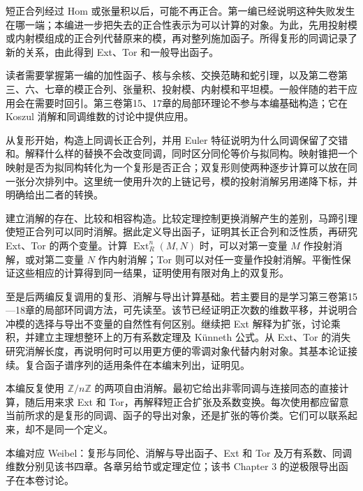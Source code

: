 
\BookPartGuide
短正合列经过 Hom 或张量积以后，可能不再正合。第一编已经说明这种失败发生在哪一端；本编进一步把失去的正合性表示为可以计算的对象。为此，先用投射模或内射模组成的正合列代替原来的模，再对整列施加函子。所得复形的同调记录了新的关系，由此得到 Ext、Tor 和一般导出函子。

\ProseParagraphBreak
读者需要掌握第一编的加性函子、核与余核、交换范畴和蛇引理，以及第二卷第三、六、七章的模正合列、张量积、投射模、内射模和平坦模。一般伴随的若干应用会在需要时回引。第三卷第15、17章的局部环理论不参与本编基础构造；它在 Koszul 消解和同调维数的讨论中提供应用。

\ProseParagraphBreak
{}从复形开始，构造上同调长正合列，并用 Euler 特征说明为什么同调保留了交错和。解释什么样的替换不会改变同调，同时区分同伦等价与拟同构。映射锥把一个映射是否为拟同构转化为一个复形是否正合；双复形则使两种逐步计算可以放在同一张分次排列中。这里统一使用升次的上链记号，模的投射消解另用递降下标，并明确给出二者的转换。

\ProseParagraphBreak
{}建立消解的存在、比较和相容构造。比较定理控制更换消解产生的差别，马蹄引理使短正合列可以同时消解。据此定义导出函子，证明其长正合列和泛性质，再研究 Ext、Tor 的两个变量。计算 \(\operatorname{Ext}_R^n(M,N)\) 时，可以对第一变量 \(M\) 作投射消解，或对第二变量 \(N\) 作内射消解；Tor 则可以对任一变量作投射消解。平衡性保证这些相应的计算得到同一结果，证明使用有限对角上的双复形。

\ProseParagraphBreak
{}至是后两编反复调用的复形、消解与导出计算基础。若主要目的是学习第三卷第15—18章的局部环同调方法，可先读至。该节已经证明正次数的维数平移，并说明合冲模的选择与导出不变量的自然性有何区别。继续把 Ext 解释为扩张，讨论乘积，并建立主理想整环上的万有系数定理及 Künneth 公式。从 Ext、Tor 的消失研究消解长度，再说明何时可以用更方便的零调对象代替内射对象。其基本论证接续。复合函子谱序列的适用条件在本编末列出，证明见。

\ProseParagraphBreak
本编反复使用 \(\mathbb Z/n\mathbb Z\) 的两项自由消解。最初它给出非零同调与连接同态的直接计算，随后用来求 Ext 和 Tor，再解释短正合扩张及系数变换。每次使用都应留意当前所求的是复形的同调、函子的导出对象，还是扩张的等价类。它们可以联系起来，却不是同一个定义。

\ProseParagraphBreak
本编对应 Weibel\cite[Chapters 1--4]{Weibel1994HomologicalAlgebra}：复形与同伦、消解与导出函子、Ext 和 Tor 及万有系数、同调维数分别见该书四章。各章另给节或定理定位；该书 Chapter 3 的逆极限导出函子在本卷讨论。







